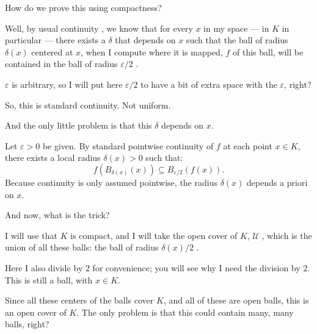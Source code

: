 \begin{proofWrapper}
\begin{speech}[01:16:18 - 01:18:10]
How do we prove this using compactness?

Well, by usual continuity , we know that for every $x$ in my space --- in $K$ in particular --- there exists a $\delta$ that depends on $x$  such that the ball of radius $\delta(x)$ centered at $x$, when I compute where it is mapped, $f$ of this ball, will be contained in the ball of radius $\varepsilon/2$ .

$\varepsilon$ is arbitrary, so I will put here $\varepsilon/2$ to have a bit of extra space with the $\varepsilon$, right?

So, this is standard continuity. Not uniform.

And the only little problem is that this $\delta$ depends on $x$.
\end{speech}

\begin{content}
Let $\varepsilon > 0$ be given.
By standard pointwise continuity of $f$ at each point $x \in K$, there exists a local radius $\delta(x) > 0$ such that:
\begin{equation}\label{eq:pointwise-continuity-delta}
f(B_{\delta(x)}(x)) \subseteq B_{\varepsilon/2}(f(x)).
\end{equation}
Because continuity is only assumed pointwise, the radius $\delta(x)$ depends a priori on $x$.
\end{content}

\begin{speech}[01:18:10 - 01:20:08]
And now, what is the trick?

I will use that $K$ is compact, and I will take the open cover of $K$, $\mathcal{U}$ , which is the union of all these balls: the ball of radius $\delta(x)/2$ .

Here I also divide by $2$ for convenience; you will see why I need the division by $2$. This is still a ball, with $x \in K$.

Since all these centers of the balls cover $K$, and all of these are open balls, this is an open cover of $K$. The only problem is that this could contain many, many balls, right?


\end{speech}
\end{proofWrapper}
